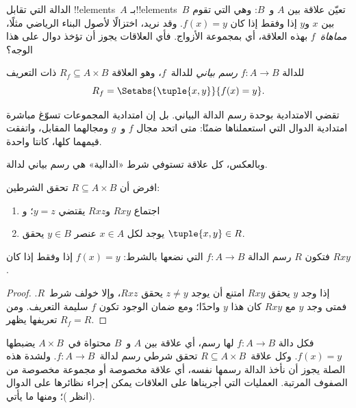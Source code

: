 \documentclass[../../../include/open-logic-section]{subfiles}
\begin{document}


\begin{explain}
الدالة التي تقابل !!{element}s~$A$ بـ!!{element}s~$B$ تعيّن علاقة
بين $A$ و~$B$: وهي التي تقوم بين $x$ و$y$ إذا وفقط إذا كان
$f(x) = y$. وقد نريد، اختزالًا لأصول البناء الرياضي مثلًا،
\emph{مماهاة}~$f$ بهذه العلاقة، أي بمجموعة الأزواج.
فأي العلاقات يجوز أن تؤخذ دوال على هذا الوجه؟
\end{explain}

\begin{defn}
للدالة $f\colon A \to B$ \emph{رسم بياني} للدالة~$f$، وهو العلاقة
$R_f \subseteq A \times B$ ذات التعريف
\[
R_f = \Setabs{\tuple{x,y}}{f(x) = y}.
\]
\end{defn}

\begin{explain}
تقضي الامتدادية بوحدة رسم الدالة البياني. بل إن امتدادية المجموعات
تسوّغ مباشرة امتدادية الدوال التي استعملناها ضمنًا: متى اتحد
مجال $f$ و~$g$ ومجالهما المقابل، واتفقت قيمهما كلها، كانتا واحدة.

وبالعكس، كل علاقة تستوفي شرط «الدالية» هي رسم بياني لدالة.
\end{explain}

\begin{prop}
افرض أن $R \subseteq A \times B$ تحقق الشرطين:
\begin{enumerate}
\item اجتماع $Rxy$ و$Rxz$ يقتضي $y = z$؛ و
\item يوجد لكل $x \in A$ عنصر $y \in B$ يحقق $\tuple{x,
y} \in R$.
\end{enumerate}
فتكون $R$ رسم الدالة $f\colon A \to B$ التي نضعها بالشرط:
$f(x) = y$ إذا وفقط إذا كان $Rxy$.
\end{prop}

\begin{proof}
إذا وجد $y$ يحقق $Rxy$ امتنع أن يوجد $z \neq
y$ يحقق $Rxz$، وإلا خولف شرط~$R$. فمتى وجد $y$ مع $Rxy$ كان
هذا $y$ واحدًا؛ ومع ضمان الوجود تكون $f$ سليمة التعريف.
ومن تعريفها يظهر $R_f = R$.
\end{proof}

\begin{explain}
فكل دالة $f\colon A \to B$ لها رسم، أي علاقة بين $A$ و~$B$
محتواة في~$A \times B$ يضبطها $f(x) = y$. وكل علاقة~$R
\subseteq A \times B$ تحقق شرطي  رسم
لدالة~$f \colon A \to B$. ولشدة هذه الصلة يجوز أن نأخذ الدالة
رسمها نفسه، أي علاقة مخصوصة أو مجموعة مخصوصة من الصفوف المرتبة.
العمليات التي أجريناها على العلاقات يمكن إجراء نظائرها على الدوال
(انظر )؛ ومنها ما يأتي.
\end{explain}
\end{document}
